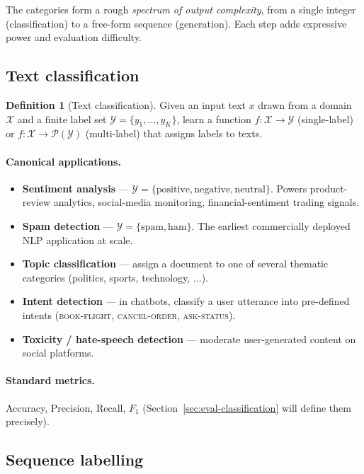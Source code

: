 \documentclass[12pt,a4paper]{report}
\theoremstyle{definition}
\newtheorem{definition}{Definition}[section]
\theoremstyle{remark}
\begin{document}
The categories form a rough \emph{spectrum of output complexity}, from a single integer (classification) to a free-form sequence (generation). Each step adds expressive power and evaluation difficulty.

\subsection{Text classification}

\begin{definition}[Text classification]
Given an input text $x$ drawn from a domain $\mathcal{X}$ and a finite label set $\mathcal{Y} = \{y_1, \dots, y_K\}$, learn a function $f : \mathcal{X} \to \mathcal{Y}$ (single-label) or $f : \mathcal{X} \to \mathcal{P}(\mathcal{Y})$ (multi-label) that assigns labels to texts.
\end{definition}

\paragraph{Canonical applications.}
\begin{itemize}
    \item \textbf{Sentiment analysis} --- $\mathcal{Y} = \{\text{positive}, \text{negative}, \text{neutral}\}$. Powers product-review analytics, social-media monitoring, financial-sentiment trading signals.
    \item \textbf{Spam detection} --- $\mathcal{Y} = \{\text{spam}, \text{ham}\}$. The earliest commercially deployed NLP application at scale.
    \item \textbf{Topic classification} --- assign a document to one of several thematic categories (politics, sports, technology, $\ldots$).
    \item \textbf{Intent detection} --- in chatbots, classify a user utterance into pre-defined intents (\textsc{book-flight}, \textsc{cancel-order}, \textsc{ask-status}).
    \item \textbf{Toxicity / hate-speech detection} --- moderate user-generated content on social platforms.
\end{itemize}

\paragraph{Standard metrics.} Accuracy, Precision, Recall, $F_1$ (Section~\ref{sec:eval-classification} will define them precisely).

\subsection{Sequence labelling}
\end{document}
